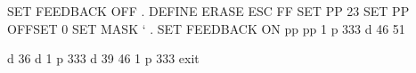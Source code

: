 SET FEEDBACK OFF                                                                
.                                                                               
DEFINE ERASE ESC FF                                                             
SET PP 23                                                                       
SET PP OFFSET 0                                                                 
SET MASK `                                                                      
.                                                                               
SET FEEDBACK ON                                                                 
pp                                                                              
pp                                                                              
1                                                                               
p 333                                                                           
d 46 51                                                                         
                                                                                
                                                                                
d                                                                               
36                                                                              
d                                                                               
1                                                                               
p 333                                                                           
d 39 46                                                                         
1                                                                               
p 333                                                                           
exit                                                                            
